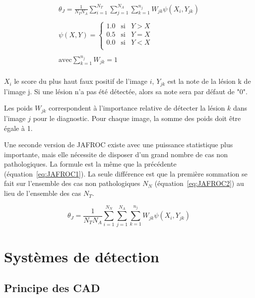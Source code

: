 \begin{equation}
\label{eq:JAFROC1}
\begin{array}{l}
	\displaystyle \theta_J=\frac{1}{N_T N_A} \sum_{i=1}^{N_T} \sum_{j=1}^{N_A} \sum_{k=1}^{n_j} W_{jk} \psi(X_i, Y_{jk}) \\
	\\
	\displaystyle \psi(X,Y) = \left\{
		\begin{array}{lll}
			1.0 & \mbox{si} & Y > X \\
			0.5 & \mbox{si} & Y = X    \\
			0.0 & \mbox{si} & Y < X    \\
		\end{array}
	\right. \\
	\\
	\displaystyle \mbox{avec} \sum_{k=1}^{n_j} W_{jk} = 1 \\
\end{array}
\end{equation}

$X_i$ le score du plus haut faux positif de l'image $i$, $Y_{jk}$ est la note de la lésion k de l'image j. Si une lésion n'a pas été détectée, alors sa note sera par défaut de "0".

Les poids $W_{jk}$ correspondent à l'importance relative de détecter la lésion $k$ dans l'image $j$ pour le diagnostic. Pour chaque image, la somme des poids doit être égale à 1.

Une seconde version de JAFROC existe avec une puissance statistique plus importante, mais elle nécessite de disposer d'un grand nombre de cas non pathologiques. La formule est la même que la précédente (équation~\ref{eq:JAFROC1}). La seule différence est que la première sommation se fait sur l'ensemble des cas non pathologiques $N_N$ (équation~\ref{eq:JAFROC2}) au lieu de l'ensemble des cas $N_T$.

\begin{equation}
\label{eq:JAFROC2}
\theta_J=\frac{1}{N_T N_A} \sum_{i=1}^{N_N} \sum_{j=1}^{N_A} \sum_{k=1}^{n_j} W_{jk} \psi(X_i, Y_{jk})
\end{equation}


\chapter{Systèmes de détection}

\section{Principe des CAD}

